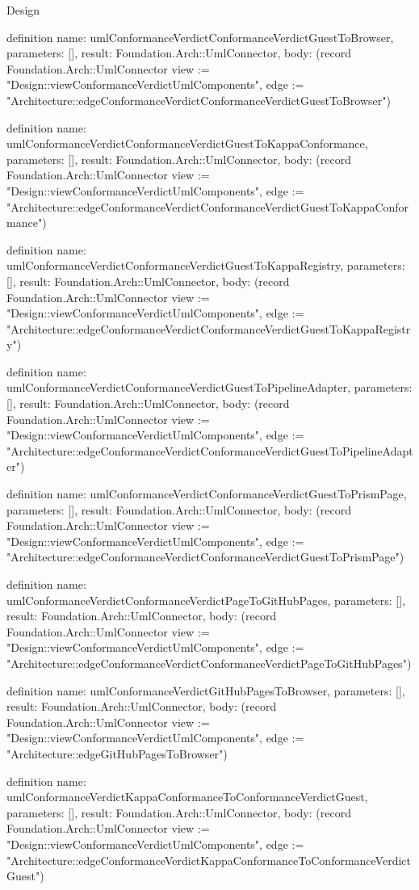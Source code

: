 \begin{lexlean}{Design}
\begin{semanticmodule}
definition{
  name: umlConformanceVerdictConformanceVerdictGuestToBrowser,
  parameters: [],
  result: Foundation.Arch::UmlConnector,
  body: (record Foundation.Arch::UmlConnector {view := "Design::viewConformanceVerdictUmlComponents", edge := "Architecture::edgeConformanceVerdictConformanceVerdictGuestToBrowser"})
}

definition{
  name: umlConformanceVerdictConformanceVerdictGuestToKappaConformance,
  parameters: [],
  result: Foundation.Arch::UmlConnector,
  body: (record Foundation.Arch::UmlConnector {view := "Design::viewConformanceVerdictUmlComponents", edge := "Architecture::edgeConformanceVerdictConformanceVerdictGuestToKappaConformance"})
}

definition{
  name: umlConformanceVerdictConformanceVerdictGuestToKappaRegistry,
  parameters: [],
  result: Foundation.Arch::UmlConnector,
  body: (record Foundation.Arch::UmlConnector {view := "Design::viewConformanceVerdictUmlComponents", edge := "Architecture::edgeConformanceVerdictConformanceVerdictGuestToKappaRegistry"})
}

definition{
  name: umlConformanceVerdictConformanceVerdictGuestToPipelineAdapter,
  parameters: [],
  result: Foundation.Arch::UmlConnector,
  body: (record Foundation.Arch::UmlConnector {view := "Design::viewConformanceVerdictUmlComponents", edge := "Architecture::edgeConformanceVerdictConformanceVerdictGuestToPipelineAdapter"})
}

definition{
  name: umlConformanceVerdictConformanceVerdictGuestToPrismPage,
  parameters: [],
  result: Foundation.Arch::UmlConnector,
  body: (record Foundation.Arch::UmlConnector {view := "Design::viewConformanceVerdictUmlComponents", edge := "Architecture::edgeConformanceVerdictConformanceVerdictGuestToPrismPage"})
}

definition{
  name: umlConformanceVerdictConformanceVerdictPageToGitHubPages,
  parameters: [],
  result: Foundation.Arch::UmlConnector,
  body: (record Foundation.Arch::UmlConnector {view := "Design::viewConformanceVerdictUmlComponents", edge := "Architecture::edgeConformanceVerdictConformanceVerdictPageToGitHubPages"})
}

definition{
  name: umlConformanceVerdictGitHubPagesToBrowser,
  parameters: [],
  result: Foundation.Arch::UmlConnector,
  body: (record Foundation.Arch::UmlConnector {view := "Design::viewConformanceVerdictUmlComponents", edge := "Architecture::edgeGitHubPagesToBrowser"})
}

definition{
  name: umlConformanceVerdictKappaConformanceToConformanceVerdictGuest,
  parameters: [],
  result: Foundation.Arch::UmlConnector,
  body: (record Foundation.Arch::UmlConnector {view := "Design::viewConformanceVerdictUmlComponents", edge := "Architecture::edgeConformanceVerdictKappaConformanceToConformanceVerdictGuest"})
}


\end{semanticmodule}
\end{lexlean}
